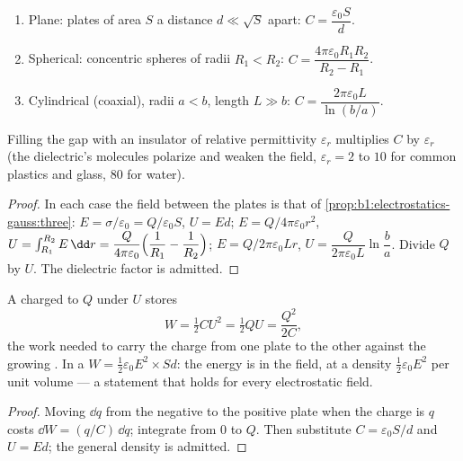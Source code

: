 \begin{proposition}\label{prop:b1:potential-capacitors:three}
\begin{enumerate}
  \item Plane: plates of area $S$ a distance $d \ll \sqrt S$ apart:
        $C = \dfrac{\varepsilon_0S}{d}$.
  \item Spherical: concentric spheres of radii $R_1 < R_2$:
        $C = \dfrac{4\pi\varepsilon_0R_1R_2}{R_2 - R_1}$.
  \item Cylindrical (coaxial), radii $a < b$, length $L \gg b$:
        $C = \dfrac{2\pi\varepsilon_0L}{\ln(b/a)}$.
\end{enumerate}
Filling the gap with an insulator of relative permittivity
$\varepsilon_r$ multiplies $C$ by $\varepsilon_r$ (the dielectric's molecules
polarize and weaken the field, $\varepsilon_r = 2$ to $10$ for common
plastics and glass, $80$ for water).
\end{proposition}

\begin{proof}
In each case the field between the plates is that of
\cref{prop:b1:electrostatics-gauss:three}: $E = \sigma/\varepsilon_0 = Q/\varepsilon_0S$,
$U = Ed$; $E = Q/4\pi\varepsilon_0r^2$, $U = \int_{R_1}^{R_2}E\,\dd r = \dfrac{Q}{4\pi\varepsilon_0}
\Bigl(\dfrac1{R_1} - \dfrac1{R_2}\Bigr)$; $E = Q/2\pi\varepsilon_0Lr$, $U =
\dfrac{Q}{2\pi\varepsilon_0L}\ln\dfrac ba$. Divide $Q$ by $U$. The dielectric
factor is admitted.
\end{proof}

\begin{theorem}\label{thm:b1:potential-capacitors:energy}
A  charged to $Q$ under $U$ stores
\[
W = \tfrac12 CU^2 = \tfrac12 QU = \frac{Q^2}{2C} ,
\]
the work needed to carry the charge from one plate to the other
against the growing . In a  $W = \tfrac12\varepsilon_0E^2
\times Sd$: the energy is in the field, at a density $\tfrac12\varepsilon_0E^2$
per unit volume --- a statement that holds for every electrostatic
field.
\end{theorem}

\begin{proof}
Moving $\dd q$ from the negative to the positive plate when the charge
is $q$ costs $\dd W = (q/C)\,\dd q$; integrate from $0$ to $Q$. Then
substitute $C = \varepsilon_0S/d$ and $U = Ed$; the general density is admitted.
\end{proof}

